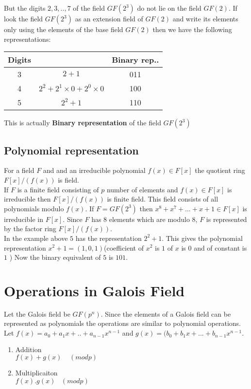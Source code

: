 But the digits \(2,3,..,7\) of the field \(GF(2^3)\) do not lie on the field \(GF(2)\). If look the field \(GF(2^3)\) as an extension field of \(GF(2)\) and write its elements only using the elements of the base field \(GF(2)\) then we have the following representations:
\vspace{3mm}

\begin{tabular}{|c|c|c|}
    \hline
    Digits & \ & Binary rep..\\
    \hline
    3 & \(2+1\) & 011 \\
    4 & \(2^2+2^1 \times 0 +2^0 \times 0\) & 100 \\
    5 & \(2^2+1\) & 110 \\
    \hline
\end{tabular}
\vspace{3mm}

This is actually \textbf{Binary representation} of the field \(GF(2^3)\)



\subsection{Polynomial representation}
For a field \(F\) and and an irreducible polynomial \(f(x) \in F[x]\) the quotient ring \(F[x]/(f(x))\) is field.\\
If \(F\) is a finite field consisting of \(p\) number of elements and \(f(x) \in F[x]\) is irreducible then \(F[x]/(f(x))\) is finite field. This field consists of all polynomials modulo \(f(x)\). If \(F=GF(2^3)\) then \(x^8+x^7+...+x+1 \in F[x]\) is irreducible in \(F[x]\). Since \(F\) has \(8\) elements which are modulo \(8\), \(F\) is represented by the factor ring \(F[x]/(f(x))\). \\


In the example above \(5\) has the representation \(2^2+1\). This gives the polynomial representation \(x^2+1=(1,0,1)\)(coefficient of \(x^2\) is \(1\) of \(x\) is \(0\) and of constant is \(1\) ) Now the binary equivalent of \(5\) is \(101\).

\section{Operations in Galois Field}
Let the Galois field be \(GF(p^n)\). Since the elements of a Galois field can be represented as polynomials the operations are similar to polynomial operations. Let \(f(x)=a_0+a_1x+..+a_{n-1}x^{n-1}\) and \(g(x)=(b_0+b_1x+...+b_{n-1}x^{n-1}\).
\begin{enumerate}
  \item Addition \\
  \(f(x)+g(x)\;\;\;\; (modp)\) 
  
  \item Multiplicaiton \\
  \(f(x).g(x)\;\;\; (modp)\)
\end{enumerate}


